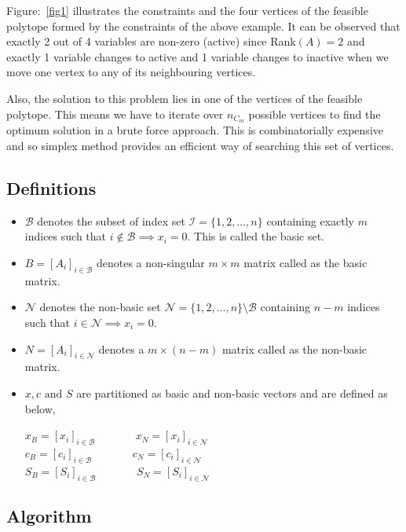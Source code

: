 \documentclass[12pt,letterpaper]{article}
\begin{document}
Figure:~\ref{fig1} illustrates the constraints and the four vertices of the feasible polytope formed by the constraints of the above example. It can be observed that exactly 2 out of 4 variables are non-zero (active) since Rank$(A)=2$ and exactly 1 variable changes to active and 1 variable changes to inactive when we move one vertex to any of its neighbouring vertices.

Also, the solution to this problem lies in one of the vertices of the feasible polytope. This means we have to iterate over $n_{C_m}$ possible vertices to find the optimum solution in a brute force approach. This is combinatorially expensive and so simplex method provides an efficient way of searching this set of vertices.

\subsection{Definitions}

\begin{itemize}
	\item $\mathcal{B}$ denotes the subset of index set $\mathcal{I} = \{1,2,\dots,n\}$ containing exactly $m$ indices such that $i \notin \mathcal{B} \implies x_i = 0$. This is called the basic set.
	\item $B = [A_i]_{i \in \mathcal{B}}$ denotes a non-singular $m\times m$ matrix called as the basic matrix.
	\item $\mathcal{N}$ denotes the non-basic set $\mathcal{N} = \{1,2,\dots,n\}\setminus\mathcal{B}$ containing $n-m$ indices such that $i \in \mathcal{N} \implies x_i = 0$.
	\item $N = [A_i]_{i \in \mathcal{N}}$ denotes a $m\times (n-m)$ matrix called as the non-basic matrix.
	\item $x, c \text{ and } S$ are partitioned as basic and non-basic vectors and are defined as below,
	      \begin{center}
				$x_B = [x_i]_{i \in \mathcal{B}}$ ~~~~~~ $x_N = [x_i]_{i \in \mathcal{N}}$ \\
				$c_B = [c_i]_{i \in \mathcal{B}}$ ~~~~~~ $c_N = [c_i]_{i \in \mathcal{N}}$ \\
				$S_B = [S_i]_{i \in \mathcal{B}}$ ~~~~~~ $S_N = [S_i]_{i \in \mathcal{N}}$ \\
	      \end{center}		  
\end{itemize}

\subsection{Algorithm}
\end{document}
